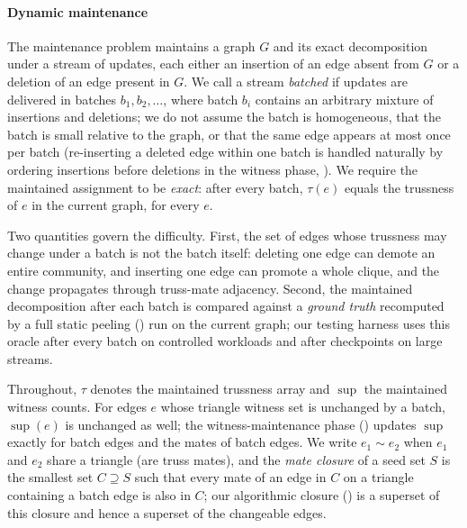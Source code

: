 \paragraph{Dynamic maintenance}
The maintenance problem maintains a graph $G$ and its exact decomposition under a stream of updates, each either an insertion of an edge absent from $G$ or a deletion of an edge present in $G$.
We call a stream \emph{batched} if updates are delivered in batches $b_1,b_2,\dots$, where batch $b_i$ contains an arbitrary mixture of insertions and deletions; we do not assume the batch is homogeneous, that the batch is small relative to the graph, or that the same edge appears at most once per batch (re-inserting a deleted edge within one batch is handled naturally by ordering insertions before deletions in the witness phase, ).
We require the maintained assignment to be \emph{exact}: after every batch, $\tau(e)$ equals the trussness of $e$ in the current graph, for every $e$.

Two quantities govern the difficulty.
First, the set of edges whose trussness may change under a batch is not the batch itself: deleting one edge can demote an entire community, and inserting one edge can promote a whole clique, and the change propagates through truss-mate adjacency.
Second, the maintained decomposition after each batch is compared against a \emph{ground truth} recomputed by a full static peeling () run on the current graph; our testing harness uses this oracle after every batch on controlled workloads and after checkpoints on large streams.

Throughout, $\tau$ denotes the maintained trussness array and $\sup$ the maintained witness counts.
For edges $e$ whose triangle witness set is unchanged by a batch, $\sup(e)$ is unchanged as well; the witness-maintenance phase () updates $\sup$ exactly for batch edges and the mates of batch edges.
We write $e_1\sim e_2$ when $e_1$ and $e_2$ share a triangle (are truss mates), and the \emph{mate closure} of a seed set $S$ is the smallest set $C\supseteq S$ such that every mate of an edge in $C$ on a triangle containing a batch edge is also in $C$; our algorithmic closure () is a superset of this closure and hence a superset of the changeable edges.
